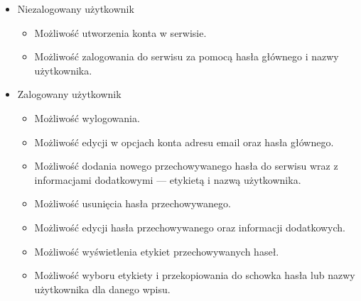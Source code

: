 \documentclass{article}
\begin{document}
    \begin{itemize}
		\item Niezalogowany użytkownik
			\begin{itemize}
				\item Możliwość utworzenia konta w serwisie.
				\item Możliwość zalogowania do serwisu za pomocą hasła głównego i nazwy użytkownika.
			\end{itemize}

		\item Zalogowany użytkownik
			\begin{itemize}
				\item Możliwość wylogowania.
				\item Możliwość edycji w opcjach konta adresu email oraz hasła głównego.
				\item Możliwość dodania nowego przechowywanego hasła do serwisu wraz z informacjami dodatkowymi --- etykietą i nazwą użytkownika.
				\item Możliwość usunięcia hasła przechowywanego.
				\item Możliwość edycji hasła przechowywanego oraz informacji dodatkowych.
				\item Możliwość wyświetlenia etykiet przechowywanych haseł.
				\item Możliwość wyboru etykiety i przekopiowania do schowka hasła lub nazwy użytkownika dla danego wpisu.
			\end{itemize}
	\end{itemize}
\end{document}
